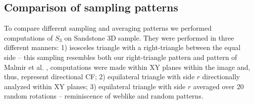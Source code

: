 \documentclass[reprint,amsmath,amssymb,aps,pre,showkeys,showpacs]{revtex4-1}
\begin{document}
\subsection{Comparison of sampling patterns}
\label{sec:compare_patterns}
To compare different sampling and averaging patterns we performed computations
of $S_3$ on Sandstone 3D sample.  They were performed in three different
manners: 1) isosceles triangle with a right-triangle between the equal side --
this sampling resembles both our right-triangle pattern and pattern of Malmir et
al. \cite{malmir2018}, computations were made within XY planes within the image
and, thus, represent directional CF; 2) equilateral triangle with side $r$
directionally analyzed within XY planes; 3) equilateral triangle with side $r$
averaged over 20 random rotations -- reminiscence of weblike and random
patterns.
\end{document}
